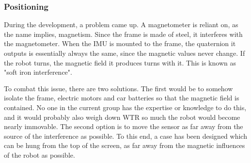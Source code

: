 \subsubsection{Positioning}
During the development, a problem came up.
A magnetometer is reliant on, as the name implies, magnetism.
Since the frame is made of steel, it interferes with the magnetometer.
When the IMU is mounted to the frame, the quaternion it outputs is essentially always the same, since the magnetic values never change.
If the robot turns, the magnetic field it produces turns with it.
This is known as "soft iron interference".

To combat this issue, there are two solutions.
The first would be to somehow isolate the frame, electric motors and car batteries so that the magnetic field is contained.
No one in the current group has the expertise or knowledge to do this, and it would probably also weigh down WTR so much the robot would become nearly immovable.
The second option is to move the sensor as far away from the source of the interference as possible.
To this end, a case has been designed which can be hung from the top of the screen, as far away from the magnetic influences of the robot as possible.

\newpage    
    